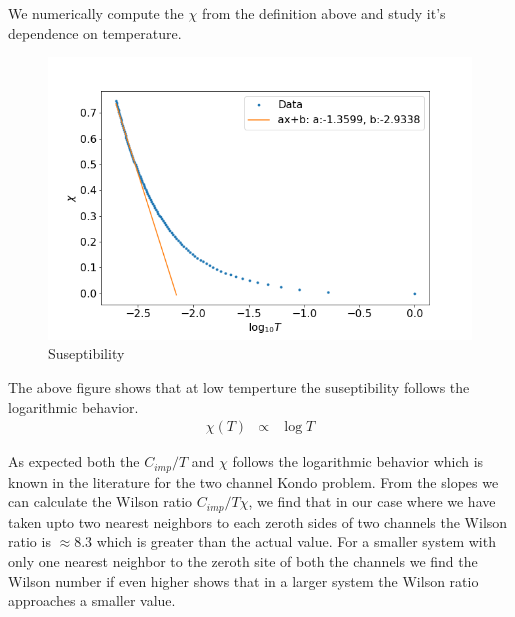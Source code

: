 \documentclass[reprint,prb,superscriptaddress]{revtex4-2}
\begin{document}
We numerically compute the $\chi$ from the definition above and study it's dependence on temperature.
\begin{figure}[!h]
\centering
\includegraphics[scale=0.36]{plt/NFL_Chi_log_0p1}
\caption{Suseptibility}
\label{fig:NFL_susecptibility}
\end{figure}
The above figure shows that at low temperture the suseptibility follows the logarithmic behavior.
\begin{eqnarray}
\chi(T) &\propto& \log T
\end{eqnarray}

\noindent As expected both the $C_{imp}/T$ and $\chi$ follows the logarithmic behavior which is known in the literature for the two channel Kondo problem. From the slopes we can calculate the Wilson ratio $C_{imp}/T\chi$, we find that in our case where we have taken upto two nearest neighbors to each zeroth sides of two channels the Wilson ratio is $\approx 8.3$ which is greater than the actual value. For a smaller system with only one nearest neighbor to the zeroth site of both the channels we find the Wilson number if even higher shows that in a larger system the Wilson ratio approaches a smaller value. 
\end{document}
